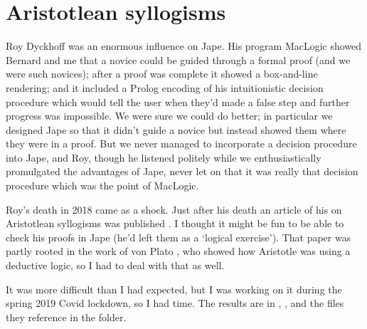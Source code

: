 \chapter{Aristotlean syllogisms}
\label{chap:Aristotle}

Roy Dyckhoff was an enormous influence on Jape. His program MacLogic \citep{dyckhoff1989malt} showed Bernard and me that a novice could be guided through a formal proof (and we were such novices); after a proof was complete it showed a box-and-line rendering; and it included a Prolog encoding of his intuitionistic decision procedure \citep{dyckhoff1992contraction} which would tell the user when they'd made a false step and further progress was impossible. We were sure we could do better; in particular we designed Jape so that it didn't guide a novice but instead showed them where they were in a proof. But we never managed to incorporate a decision procedure into Jape, and Roy, though he listened politely while we enthusiastically promulgated the advantages of Jape, never let on that it was really that decision procedure which was the point of MacLogic. 

Roy's death in 2018 came as a shock. Just after his death an article of his on Aristotlean syllogisms was published \citep{dyckhoff2019indefinite}. I thought it might be fun to be able to check his proofs in Jape (he'd left them as a `logical exercise'). That paper was partly rooted in the work of von Plato \citep{von2016aristotle}, who showed how Aristotle was using a deductive logic, so I had to deal with that as well.

It was more difficult than I had expected, but I was working on it during the spring 2019 Covid lockdown, so I had time. The results are in , , and the files they reference in the  folder.

